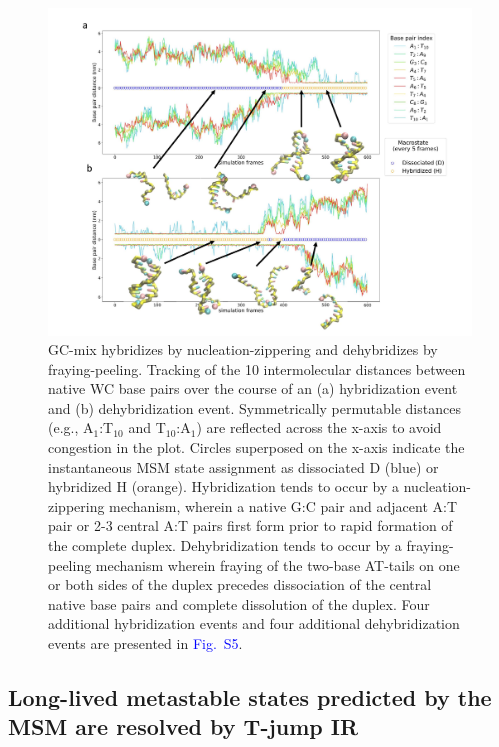 \documentclass[journal=jpcbfk,manuscript=article]{achemso}
\newcommand*{\blauw}[1]{\textcolor{blue}{#1}}
\begin{document}
\begin{figure}[ht!]
	\begin{center}
	\includegraphics[width=180mm, scale=1]{Fig4.pdf}
        \caption{GC-mix hybridizes by nucleation-zippering and dehybridizes by fraying-peeling. Tracking of the 10 intermolecular distances between native WC base pairs over the course of an (a) hybridization event and (b) dehybridization event. Symmetrically permutable distances (e.g., A$_1$:T$_{10}$ and T$_{10}$:A$_1$) are reflected across the x-axis to avoid congestion in the plot. Circles superposed on the x-axis indicate the instantaneous MSM state assignment as dissociated D (blue) or hybridized H (orange). Hybridization tends to occur by a nucleation-zippering mechanism, wherein a native G:C pair and adjacent A:T pair or 2-3 central A:T pairs first form prior to rapid formation of the complete duplex. Dehybridization tends to occur by a fraying-peeling mechanism wherein fraying of the two-base AT-tails on one or both sides of the duplex precedes dissociation of the central native base pairs and complete dissolution of the duplex. Four additional hybridization events and four additional dehybridization events are presented in \blauw{Fig.~S5}.
        }
        \label{fig:GC-mix_transitions}
	\end{center}
\end{figure}






\subsection{\label{sec:stretch_comparison}Long-lived metastable states predicted by the MSM are resolved by T-jump IR}
\end{document}
